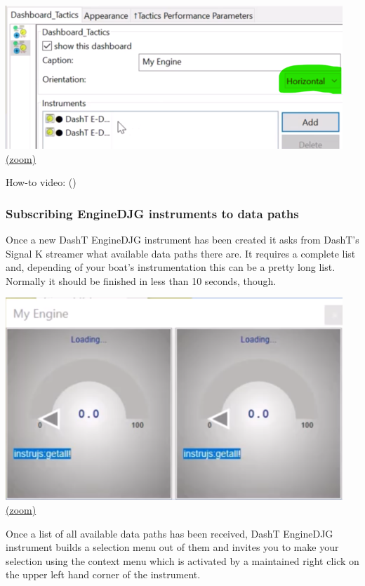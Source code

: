 \documentclass[11pt]{article}
\begin{document}
    \includegraphics{2020-02-15_Adding_DashT_EngineDDG-2.png}
\href{img/2020-02-15_Adding_DashT_EngineDDG-2.png}{(zoom)}

    How-to video: ()

    \hypertarget{subscribing-enginedjg-instruments-to-data-paths}{%
\subsubsection{Subscribing EngineDJG instruments to data
paths}\label{subscribing-enginedjg-instruments-to-data-paths}}

    Once a new DashT EngineDJG instrument has been created it asks from
DashT's Signal K streamer what available data paths there are. It
requires a complete list and, depending of your boat's instrumentation
this can be a pretty long list. Normally it should be finished in less
than 10 seconds, though.

    \includegraphics{2020-02-15_EngineDJG_loading_all_paths.png}
\href{img/2020-02-15_EngineDJG_loading_all_paths.png}{(zoom)}

    Once a list of all available data paths has been received, DashT
EngineDJG instrument builds a selection menu out of them and invites you
to make your selection using the context menu which is activated by a
maintained right click on the upper left hand corner of the instrument.
\end{document}
